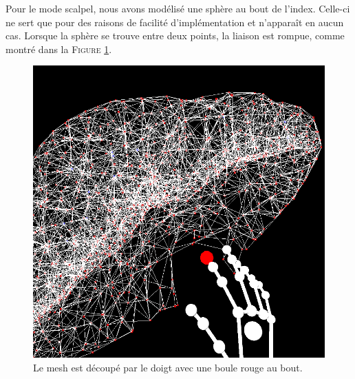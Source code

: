 \documentclass[a4paper,12pt]{article}
\begin{document}
Pour le mode \og{}scalpel\fg{}, nous avons modélisé une sphère au bout de l'index. Celle-ci ne sert que pour des raisons de facilité d'implémentation et n'apparaît en aucun cas. Lorsque la sphère se trouve entre deux points, la liaison est rompue, comme montré dans la \textsc{Figure} \ref{fig:cut}.

\begin{figure}[ht!]
  \centering
  \includegraphics[width=\textwidth, height=.5\textheight]{images/cut_scalpel.png}
  \caption{Le mesh est découpé par le doigt avec une boule rouge au bout.}
  \label{fig:cut}
\end{figure}
\end{document}
